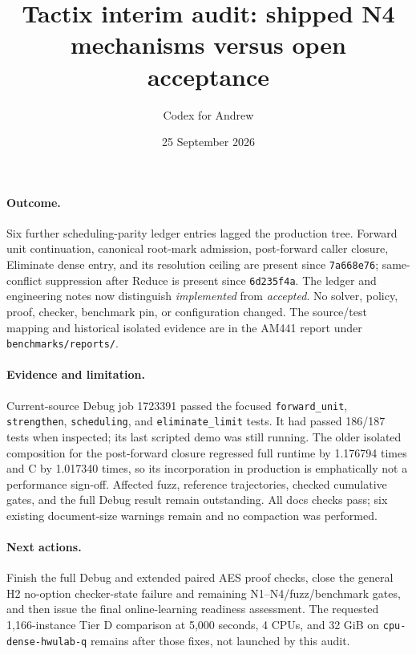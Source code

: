 \documentclass[11pt]{article}
\title{Tactix interim audit: shipped N4 mechanisms versus open acceptance}
\author{Codex for Andrew}
\date{25 September 2026}
\begin{document}
\maketitle

\paragraph{Outcome.} Six further scheduling-parity ledger entries lagged the
production tree. Forward unit continuation, canonical root-mark admission,
post-forward caller closure, Eliminate dense entry, and its resolution ceiling
are present since \texttt{7a668e76}; same-conflict suppression after Reduce is
present since \texttt{6d235f4a}. The ledger and engineering notes now distinguish
\emph{implemented} from \emph{accepted}. No solver, policy, proof, checker,
benchmark pin, or configuration changed. The source/test mapping and historical
isolated evidence are in the AM441 report under \texttt{benchmarks/reports/}.

\paragraph{Evidence and limitation.} Current-source Debug job 1723391 passed
the focused \texttt{forward\_unit}, \texttt{strengthen}, \texttt{scheduling}, and
\texttt{eliminate\_limit} tests. It had passed 186/187 tests when inspected; its
last scripted demo was still running. The older isolated composition for the
post-forward closure regressed full runtime by 1.176794 times and C by
1.017340 times, so its incorporation in production is emphatically not a
performance sign-off. Affected fuzz, reference trajectories, checked
cumulative gates, and the full Debug result remain outstanding. All docs
checks pass; six existing document-size warnings remain and no compaction was
performed.

\paragraph{Next actions.} Finish the full Debug and extended paired AES proof
checks, close the general H2 no-option checker-state failure and remaining
N1--N4/fuzz/benchmark gates, and then issue the final online-learning readiness
assessment. The requested 1,166-instance Tier D comparison at 5,000 seconds,
4 CPUs, and 32 GiB on \texttt{cpu-dense-hwulab-q} remains after those fixes,
not launched by this audit.
\end{document}
